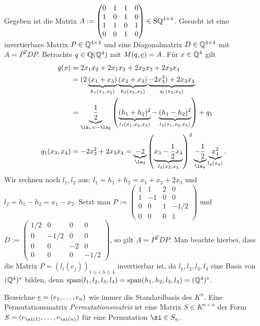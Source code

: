 \documentclass[../../main.tex]{subfiles}
\begin{document}
\begin{bsp}\label{13.5.4}
	Gegeben ist die Matrix $A:=\begin{pmatrix}0&1&1&0\\1&0&1&0\\1&1&0&1\\0&0&1&0\end{pmatrix}\in \operatorname{SQ}^{4\times 4}$. Gesucht ist eine invertierbare Matrix $P\in \mathbb Q^{4\times 4}$ und eine Diagonalmatrix $D\in \mathbb Q^{4\times 4}$ mit $A=P^TDP$. Betrachte $q\in \operatorname{Q}(\mathbb Q^4)$ mit $M(q,{\underline e})=A$. Für $x\in \mathbb Q^4$ gilt
	\begin{align*}
		q(x)&=2x_1x_2+2x_1x_3+2x_2x_3+2x_3x_4\\
		&=(2\underbrace{(x_1+x_3)}_{h_1(x_1,x_3)}\underbrace{(x_2+x_3)}_{h_2(x_2,x_3)}\underbrace{-2x_3^3)+2x_3x_4}_{q_1(x_3,x_4)}\\
		&=\underbrace{\frac{1}{2}}_{\la_1=-\la_2}\left(\underbrace{(h_1+h_2)^2}_{l_1(x_1,x_2,x_3)}-\underbrace{(h_1-h_2)^2}_{l_2(x_1,x_2,x_3)}\right)+q_1\\
		q_1(x_3,x_4)&=-2x_3^2+2x_3x_4=\underbrace{-2}_{\la_3}\left(\underbrace{x_3-\frac{1}{2}x_4}_{l_3(x_3,x_4}\right)^2\underbrace{-\frac{1}{2}}_{\la_4}\underbrace{x_4^2}_{l_4(x_4)}.
	\end{align*}
	Wir rechnen noch $l_1,l_2$ aus: $l_1=h_1+h_2=x_1+x_2+2x_3$ und $l_2=h_1-h_2=x_1-x_2$. Setzt man $P:=\begin{pmatrix*}1&1&2&0\\1&-1&0&0\\0&0&1&-1/2\\0&0&0&1\end{pmatrix*}$ und $D:=\begin{pmatrix*}1/2 & 0 & 0 & 0\\0&-1/2&0&0\\ 0&0&-2&0\\ 0&0&0&-1/2\end{pmatrix*}$, so gilt $A=P^TDP$. Man beachte hierbei, dass die Matrix $P=(l_i(e_j))_{1\le i,h\le 4}$ invertierbar ist, da $l_1,l_2,l_3,l_4$ eine Basis von $(\mathbb Q^4)^*$ bilden, denn $\operatorname{span}(l_1,l_2,l_3,l_4)=\operatorname{span}(h_1,h_2,l_3,l_4)=(\mathbb Q^4)^*$.
\end{bsp}

\begin{df}\label{13.5.5}
	Bezeichne ${\underline e}=(e_1,\ldots ,e_n)$ wie immer die Standardbasis des $K^n$. Eine Permutationsmatrix \emph{Permutationsmatrix} ist eine Matrix $S\in K^{n\times n}$ der Form $S=(e_{\si(1)},\ldots ,e_{\si(n)})$ für eine Permutation $\si \in S_n$.
\end{df}
	
\end{document}
